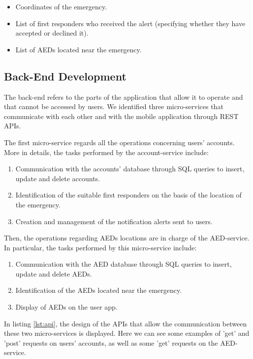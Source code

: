 \documentclass[11pt,a4paper]{article}
\begin{document}
\begin{itemize}
    \item Coordinates of the emergency.
    \item List of first responders who received the alert (specifying whether they have accepted or declined it).
    \item List of AEDs located near the emergency.
\end{itemize}

\subsection{Back-End Development}
The back-end refers to the parts of the application that allow it to operate and that cannot be accessed by users.
%
We identified three micro-services that communicate with each other and with the mobile application through REST APIs.

The first micro-service regards all the operations concerning users' accounts.
%
More in details, the tasks performed by the account-service include:

\begin{enumerate}
    \item Communication with the accounts' database through SQL queries to insert, update and delete accounts.
    \item Identification of the suitable first responders on the basis of the location of the emergency.
    \item Creation and management of the notification alerts sent to users.
\end{enumerate}

Then, the operations regarding AEDs locations are in charge of the AED-service. 
%
In particular, the tasks performed by this micro-service include:

\begin{enumerate}
    \item Communication with the AED database through SQL queries to insert, update and delete AEDs.
    \item Identification of the AEDs located near the emergency.
    \item Display of AEDs on the user app.
\end{enumerate}

In listing \ref{lst:api}, the design of the APIs that allow the communication between these two micro-services is displayed.
%
Here we can see some examples of 'get' and 'post' requests on users' accounts, as well as some 'get' requests on the AED-service.
\end{document}
